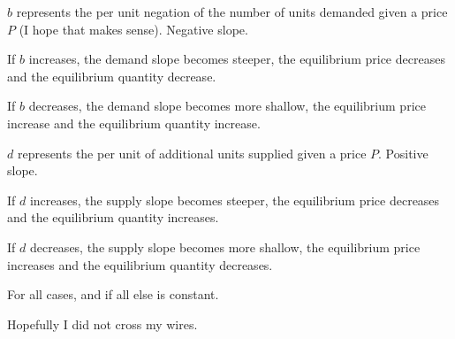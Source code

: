 \documentclass[12pt]{article}
\newcounter{ques}
\newenvironment{question}{\stepcounter{ques}{\noindent\bf Question \arabic{ques}:}}{\vspace{5mm}}
\begin{document}
\begin{question}
\begin{enumerate}[label=(\alph*)]
            $b$ represents the per unit negation of the number of units demanded given a price $P$ (I hope that makes sense). Negative slope.
            
            If $b$ increases, the demand slope becomes steeper, the equilibrium price decreases and the equilibrium quantity decrease.

            If $b$ decreases, the demand slope becomes more shallow, the equilibrium price increase and the equilibrium quantity increase.

            $d$ represents the per unit of additional units supplied given a price $P$. Positive slope.

            If $d$ increases, the supply slope becomes steeper, the equilibrium price decreases and the equilibrium quantity increases.

            If $d$ decreases, the supply slope becomes more shallow, the equilibrium price increases and the equilibrium quantity decreases.

            For all cases, and if all else is constant.

            Hopefully I did not cross my wires.

      \end{enumerate}


\end{question}
\end{document}

